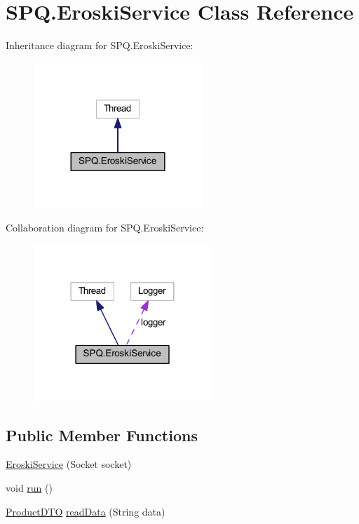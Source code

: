 \hypertarget{class_s_p_q_1_1_eroski_service}{}\section{S\+P\+Q.\+Eroski\+Service Class Reference}
\label{class_s_p_q_1_1_eroski_service}


Inheritance diagram for S\+P\+Q.\+Eroski\+Service\+:
\nopagebreak
\begin{figure}[H]
\begin{center}
\leavevmode
\includegraphics[width=180pt]{class_s_p_q_1_1_eroski_service__inherit__graph}
\end{center}
\end{figure}


Collaboration diagram for S\+P\+Q.\+Eroski\+Service\+:
\nopagebreak
\begin{figure}[H]
\begin{center}
\leavevmode
\includegraphics[width=190pt]{class_s_p_q_1_1_eroski_service__coll__graph}
\end{center}
\end{figure}
\subsection*{Public Member Functions}
\begin{DoxyCompactItemize}
\item 
\mbox{\hyperlink{class_s_p_q_1_1_eroski_service_a89b9137c5a6ba87692037a4b0bc2b14e}{Eroski\+Service}} (Socket socket)
\item 
void \mbox{\hyperlink{class_s_p_q_1_1_eroski_service_abacda123f2febc1eb7c2825eb4e46c37}{run}} ()
\item 
\mbox{\hyperlink{class_s_p_q_1_1dto_1_1_product_d_t_o}{Product\+D\+TO}} \mbox{\hyperlink{class_s_p_q_1_1_eroski_service_a89fa3f97cdca647e3c6d6606e5dc2443}{read\+Data}} (String data)
\end{DoxyCompactItemize}


